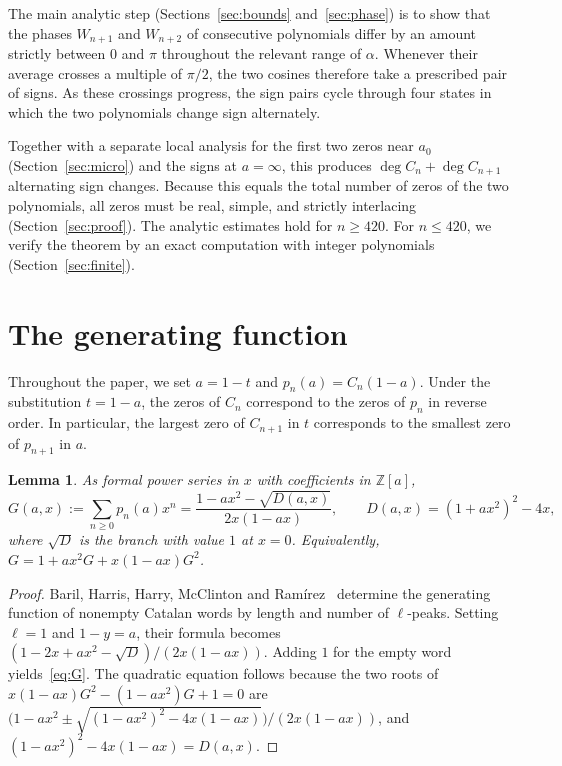\documentclass[11pt]{amsart}
\newtheorem{lemma}[theorem]{Lemma}
\theoremstyle{remark}
\begin{document}
The main analytic step (Sections~\ref{sec:bounds} and~\ref{sec:phase}) is to
show that the phases $W_{n+1}$ and $W_{n+2}$ of consecutive polynomials
differ by an amount strictly between $0$ and $\pi$ throughout the relevant
range of $\alpha$. Whenever their average crosses a multiple of $\pi/2$, the
two cosines therefore take a prescribed pair of signs. As these crossings
progress, the sign pairs cycle through four states in which the two
polynomials change sign alternately.

Together with a separate local analysis for the first two zeros near $a_0$
(Section~\ref{sec:micro}) and the signs at $a=\infty$, this produces
$\deg C_n+\deg C_{n+1}$ alternating sign changes. Because this equals the
total number of zeros of the two polynomials, all zeros must be real,
simple, and strictly interlacing (Section~\ref{sec:proof}). The analytic
estimates hold for $n\ge 420$. For $n\le 420$, we verify the theorem by an
exact computation with integer polynomials (Section~\ref{sec:finite}).

\section{The generating function}\label{sec:gf}

Throughout the paper, we set $a=1-t$ and $p_n(a)=C_n(1-a)$. Under the
substitution $t=1-a$, the zeros of $C_n$ correspond to the zeros of $p_n$ in
reverse order. In particular, the largest zero of $C_{n+1}$ in $t$
corresponds to the smallest zero of $p_{n+1}$ in $a$.

\begin{lemma}\label{lem:gf}
As formal power series in $x$ with coefficients in $\mathbb Z[a]$,
\begin{equation}\label{eq:G}
 G(a,x):=\sum_{n\ge0}p_n(a)x^n=\frac{1-ax^2-\sqrt{D(a,x)}}{2x(1-ax)},\qquad
 D(a,x)=(1+ax^2)^2-4x,
\end{equation}
where $\sqrt{D}$ is the branch with value $1$ at $x=0$. Equivalently,
$G=1+ax^2G+x(1-ax)G^2$.
\end{lemma}

\begin{proof}
Baril, Harris, Harry, McClinton and Ram\'irez~\cite[Theorem~5.1]{BHHMR}
determine the generating function of nonempty Catalan words by length and
number of $\ell$-peaks. Setting $\ell=1$ and $1-y=a$, their formula becomes
$(1-2x+ax^2-\sqrt{D})/(2x(1-ax))$. Adding $1$ for the empty word
yields~\eqref{eq:G}. The quadratic equation follows because the two roots of
$x(1-ax)G^2-(1-ax^2)G+1=0$ are
$\bigl(1-ax^2\pm\sqrt{(1-ax^2)^2-4x(1-ax)}\bigr)/(2x(1-ax))$, and
$(1-ax^2)^2-4x(1-ax)=D(a,x)$.
\end{proof}
\end{document}
